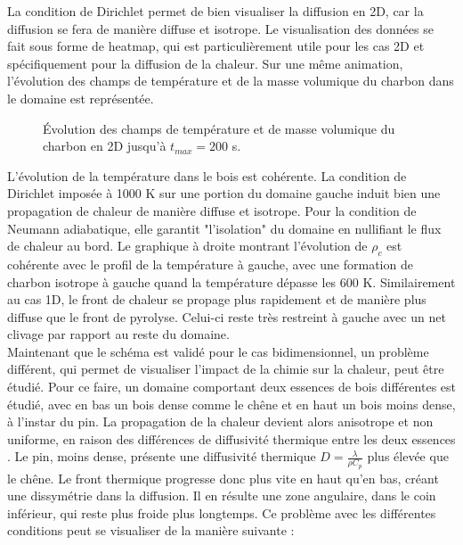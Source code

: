 \documentclass[a4paper,11pt]{article}
\begin{document}
La condition de Dirichlet permet de bien visualiser la diffusion en 2D, car la diffusion se fera de manière diffuse et isotrope. Le visualisation des données se fait sous forme de heatmap, qui est particulièrement utile pour les cas 2D et spécifiquement pour la diffusion de la chaleur. Sur une même animation, l'évolution des champs de température et de la masse volumique du charbon dans le domaine est représentée.
\begin{figure}[H]
    \caption{\centering Évolution des champs de température et de masse volumique du charbon en 2D jusqu'à $t_{max} = 200$ s.}
\end{figure}

L'évolution de la température dans le bois est cohérente. La condition de Dirichlet imposée à 1000 K sur une portion du domaine gauche induit bien une propagation de chaleur de manière diffuse et isotrope. Pour la condition de Neumann adiabatique, elle garantit "l'isolation" du domaine en nullifiant le flux de chaleur au bord. Le graphique à droite montrant l'évolution de $\rho_c$ est cohérente avec le profil de la température à gauche, avec une formation de charbon isotrope à gauche quand la température dépasse les 600 K. Similairement au cas 1D, le front de chaleur se propage plus rapidement et de manière plus diffuse que le front de pyrolyse. Celui-ci reste très restreint à gauche avec un net clivage par rapport au reste du domaine. \\

Maintenant que le schéma est validé pour le cas bidimensionnel, un problème différent, qui permet de visualiser l'impact de la chimie sur la chaleur, peut être étudié. Pour ce faire, un domaine comportant deux essences de bois différentes est étudié, avec en bas un bois dense comme le chêne et en haut un bois moins dense, à l'instar du pin. La propagation de la chaleur devient alors anisotrope et non uniforme, en raison des différences de diffusivité thermique entre les deux essences \cite{1}. Le pin, moins dense, présente une diffusivité thermique $D = \frac{\lambda}{\rho C_p}$ plus élevée que le chêne. Le front thermique progresse donc plus vite en haut qu’en bas, créant une dissymétrie dans la diffusion. Il en résulte une zone angulaire, dans le coin inférieur, qui reste plus froide plus longtemps. Ce problème avec les différentes conditions peut se visualiser de la manière suivante :
\end{document}
